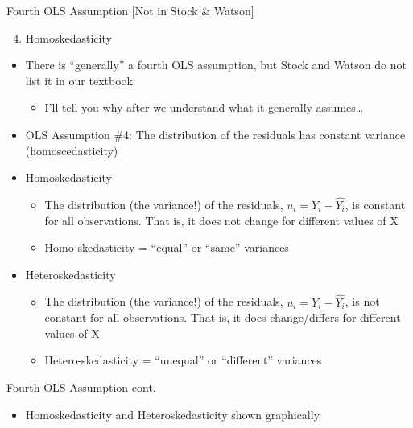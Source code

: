 \documentclass[
  8pt,
  ignorenonframetext,
  dvipsnames]{beamer}
\providecommand{\tightlist}{%
  \setlength{\itemsep}{0pt}\setlength{\parskip}{0pt}}
\let\olditem\item
\renewcommand{\item}{%
  \olditem\vspace{4pt}
}
\begin{document}
\begin{frame}{Fourth OLS Assumption {[}Not in Stock \& Watson{]}}
\protect\hypertarget{fourth-ols-assumption-not-in-stock-watson}{}

\begin{enumerate}
\setcounter{enumi}{3}
\tightlist
\item
  Homoskedasticity
\end{enumerate}

\begin{itemize}
\tightlist
\item
  There is ``generally'' a fourth OLS assumption, but Stock and Watson
  do not list it in our textbook

  \begin{itemize}
  \tightlist
  \item
    I'll tell you why after we understand what it generally
    assumes\ldots{}
  \end{itemize}
\item
  OLS Assumption \#4: The distribution of the residuals has constant
  variance (homoscedasticity)
\item
  Homoskedasticity

  \begin{itemize}
  \tightlist
  \item
    The distribution (the variance!) of the residuals,
    \(u_i = Y_i - \hat{Y_i}\), is constant for all observations. That
    is, it does not change for different values of X
  \item
    Homo-skedasticity = ``equal'' or ``same'' variances
  \end{itemize}
\item
  Heteroskedasticity

  \begin{itemize}
  \tightlist
  \item
    The distribution (the variance!) of the residuals,
    \(u_i = Y_i - \hat{Y_i}\), is not constant for all observations.
    That is, it does change/differs for different values of X
  \item
    Hetero-skedasticity = ``unequal'' or ``different'' variances
  \end{itemize}
\end{itemize}

\end{frame}

\begin{frame}{Fourth OLS Assumption cont.}
\protect\hypertarget{fourth-ols-assumption-cont.}{}

\begin{itemize}
\tightlist
\item
  Homoskedasticity and Heteroskedasticity shown graphically
\end{itemize}

\end{frame}
\end{document}
